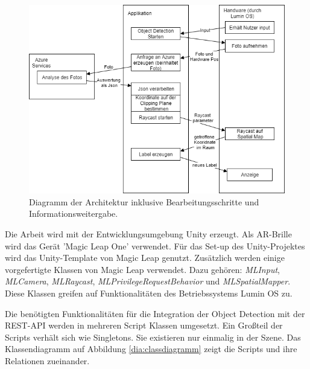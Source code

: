 \begin{figure}[H]
	\centering
	\includegraphics[width=1\textwidth]{images/dia_flow.png}
	\caption[Diagramm der Architektur]{Diagramm der Architektur inklusive Bearbeitungsschritte und Informationsweitergabe.}
	\label{dia:flow}
\end{figure}

Die Arbeit wird mit der Entwicklungsumgebung Unity erzeugt. Als AR-Brille wird das Gerät 'Magic Leap One' verwendet. Für das Set-up des Unity-Projektes wird das Unity-Template von Magic Leap genutzt. Zusätzlich werden einige vorgefertigte Klassen von Magic Leap verwendet. Dazu gehören:  \textit{MLInput}, \textit{MLCamera}, \textit{MLRaycast}, \textit{MLPrivilegeRequestBehavior} und \textit{MLSpatialMapper}. Diese Klassen greifen auf Funktionalitäten des Betriebssystems Lumin OS zu.\citep{mlgetstarted}

Die benötigten Funktionalitäten für die Integration der Object Detection mit der REST-API werden in mehreren Script Klassen umgesetzt. Ein Großteil der Scripts verhält sich wie Singletons. Sie existieren nur einmalig in der Szene. Das Klassendiagramm auf Abbildung \ref{dia:classdiagramm} zeigt die Scripts und ihre Relationen zueinander.

